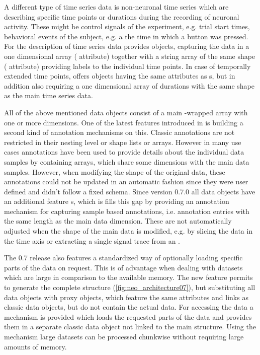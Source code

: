 A different type of time series data is non-neuronal time series which are describing specific time points or durations during the recording of neuronal activity. These might be control signals of the experiment, e.g. trial start times, behavioral events of the subject, e.g. a the time in which a button was pressed. For the description of time series data  provides  objects, capturing the data in a one dimensional  array ( attribute) together with a string array of the same shape ( attribute) providing labels to the individual time points. In case of temporally extended time points,  offers  objects having the same attributes as s, but in addition also requiring a one dimensional  array of durations with the same shape as the main time series data.

All of the above mentioned data objects consist of a main -wrapped  array with one or more dimensions. One of the latest features introduced in  is building a second kind of annotation mechanisms on this. Classic annotations are not restricted in their nesting level or shape lists or arrays. However in many use cases annotations have been used to provide details about the individual data samples by containing arrays, which share some dimensions with the main data samples. However, when modifying the shape of the original data, these annotations could not be updated in an automatic fashion since they were user defined and didn't follow a fixed schema. Since  version 0.7.0 all data objects have an additional feature s, which is fills this gap by providing an annotation mechanism for capturing sample based annotations, i.e. annotation entries with the same length as the main data dimension. These  are not automatically adjusted when the shape of the main data is modified, e.g. by slicing the data in the time axis or extracting a single signal trace from an .

The  0.7 release also features a standardized way of optionally loading specific parts of the data on request. This is of advantage when dealing with datasets which are large in comparison to the available memory. The new  feature permits to generate the complete  structure (\cref{fig:neo_architecture07}), but substituting all data objects with proxy objects, which feature the same attributes and links as classic data objects, but do not contain the actual data. For accessing the data a  mechanism is provided which loads the requested parts of the data and provides them in a separate classic data object not linked to the main  structure. Using the  mechanism large datasets can be processed chunkwise without requiring large amounts of memory.


